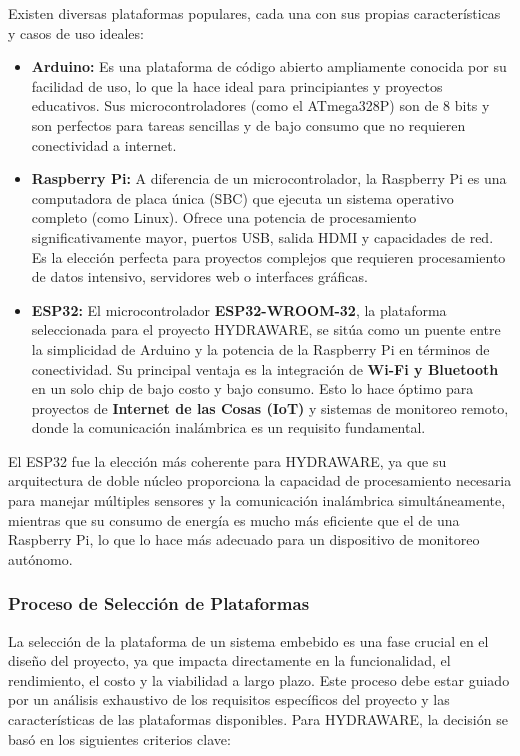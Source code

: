 \documentclass[a4paper,12pt]{article}
\begin{document}
	Existen diversas plataformas populares, cada una con sus propias características y casos de uso ideales:
	
	\begin{itemize}
		\item \textbf{Arduino:} Es una plataforma de código abierto ampliamente conocida por su facilidad de uso, lo que la hace ideal para principiantes y proyectos educativos. Sus microcontroladores (como el ATmega328P) son de 8 bits y son perfectos para tareas sencillas y de bajo consumo que no requieren conectividad a internet.
		
		\item \textbf{Raspberry Pi:} A diferencia de un microcontrolador, la Raspberry Pi es una computadora de placa única (SBC) que ejecuta un sistema operativo completo (como Linux). Ofrece una potencia de procesamiento significativamente mayor, puertos USB, salida HDMI y capacidades de red. Es la elección perfecta para proyectos complejos que requieren procesamiento de datos intensivo, servidores web o interfaces gráficas.
		
		\item \textbf{ESP32:} El microcontrolador \textbf{ESP32-WROOM-32}, la plataforma seleccionada para el proyecto HYDRAWARE, se sitúa como un puente entre la simplicidad de Arduino y la potencia de la Raspberry Pi en términos de conectividad. Su principal ventaja es la integración de \textbf{Wi-Fi y Bluetooth} en un solo chip de bajo costo y bajo consumo. Esto lo hace óptimo para proyectos de \textbf{Internet de las Cosas (IoT)} y sistemas de monitoreo remoto, donde la comunicación inalámbrica es un requisito fundamental.
	\end{itemize}
	
	El ESP32 fue la elección más coherente para HYDRAWARE, ya que su arquitectura de doble núcleo proporciona la capacidad de procesamiento necesaria para manejar múltiples sensores y la comunicación inalámbrica simultáneamente, mientras que su consumo de energía es mucho más eficiente que el de una Raspberry Pi, lo que lo hace más adecuado para un dispositivo de monitoreo autónomo.
	
	\subsubsection{Proceso de Selección de Plataformas}
	La selección de la plataforma de un sistema embebido es una fase crucial en el diseño del proyecto, ya que impacta directamente en la funcionalidad, el rendimiento, el costo y la viabilidad a largo plazo. Este proceso debe estar guiado por un análisis exhaustivo de los requisitos específicos del proyecto y las características de las plataformas disponibles. Para HYDRAWARE, la decisión se basó en los siguientes criterios clave:
	
\end{document}

